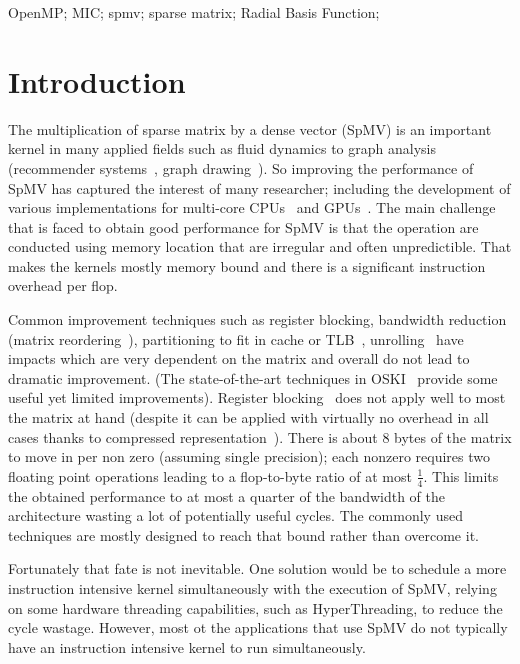 \documentclass[10pt,conference,compsocconf]{IEEEtran}
\begin{document}
\begin{IEEEkeywords}
OpenMP; MIC; spmv; sparse matrix; Radial Basis Function;
\end{IEEEkeywords}

\IEEEpeerreviewmaketitle

\section{Introduction}
The multiplication of sparse matrix by a dense vector (SpMV) is an
important kernel in many applied fields such as fluid dynamics 
\cite{journals/tog/BolzFGS03} 
to graph analysis (recommender systems~\cite{Brin98}, graph
drawing~\cite{Koren05}). So improving the performance of SpMV has
captured the interest of many researcher; including the development of
various implementations for multi-core
CPUs~\cite{Buluc2009SPAA,Williams07} and GPUs~\cite{Bell08,
  conf/ipps/KreutzerHWFBB12,
  journals/concurrency/VazquezFG11,kumar2012accelerating}. The main
challenge that is faced to obtain good performance for SpMV is that
the operation are conducted using memory location that are irregular
and often unpredictible. That makes the kernels mostly memory
bound and there is a significant instruction overhead per flop.

Common improvement techniques such as register blocking, bandwidth
reduction (matrix reordering~\cite{Cuthill69}), partitioning to fit in
cache or TLB~\cite{Nishtala07,Temam:1992:CBS:147877.148091,conf/ppsc/Toledo97},
unrolling~\cite{Mellor-Crummey04} have impacts which are very
dependent on the matrix and overall do not lead to dramatic
improvement. (The state-of-the-art techniques in OSKI~\cite{Vuduc05}
provide some useful yet limited improvements). Register blocking~\cite{conf/ppsc/Toledo97} does
not apply well to most the matrix at hand (despite it can be applied
with virtually no overhead in all cases thanks to compressed
representation~\cite{Buluc11}). There is about 8 bytes of the matrix to move
in per non zero (assuming single precision); each nonzero requires two
floating point operations leading to a flop-to-byte ratio of at most
$\frac{1}{4}$. This limits the obtained performance to at most a
quarter of the bandwidth of the architecture wasting a lot of
potentially useful cycles. The commonly used techniques are mostly
designed to reach that bound rather than overcome it.

Fortunately that fate is not inevitable. One solution would be to
schedule a more instruction intensive kernel simultaneously with the
execution of SpMV, relying on some hardware threading capabilities,
such as HyperThreading, to reduce the cycle wastage. However, most ot
the applications that use SpMV do not typically have an instruction
intensive kernel to run simultaneously.
\end{document}
